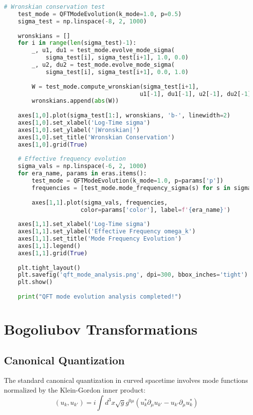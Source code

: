 \documentclass[11pt,a4paper]{article}
\begin{document}
\begin{lstlisting}[language=Python, caption=Cosmological Particle Creation]
    # Wronskian conservation test
    test_mode = QFTModeEvolution(k_mode=1.0, p=0.5)
    sigma_test = np.linspace(-8, 2, 1000)
    
    wronskians = []
    for i in range(len(sigma_test)-1):
        _, u1, du1 = test_mode.evolve_mode_sigma(
            sigma_test[i], sigma_test[i+1], 1.0, 0.0)
        _, u2, du2 = test_mode.evolve_mode_sigma(
            sigma_test[i], sigma_test[i+1], 0.0, 1.0)
        
        W = test_mode.compute_wronskian(sigma_test[i+1], 
                                       u1[-1], du1[-1], u2[-1], du2[-1])
        wronskians.append(abs(W))
    
    axes[1,0].plot(sigma_test[1:], wronskians, 'b-', linewidth=2)
    axes[1,0].set_xlabel('Log-Time sigma')
    axes[1,0].set_ylabel('|Wronskian|')
    axes[1,0].set_title('Wronskian Conservation')
    axes[1,0].grid(True)
    
    # Effective frequency evolution
    sigma_vals = np.linspace(-6, 2, 1000)
    for era_name, params in eras.items():
        test_mode = QFTModeEvolution(k_mode=1.0, p=params['p'])
        frequencies = [test_mode.mode_frequency_sigma(s) for s in sigma_vals]
        
        axes[1,1].plot(sigma_vals, frequencies, 
                      color=params['color'], label=f'{era_name}')
    
    axes[1,1].set_xlabel('Log-Time sigma')
    axes[1,1].set_ylabel('Effective Frequency omega_k')
    axes[1,1].set_title('Mode Frequency Evolution')
    axes[1,1].legend()
    axes[1,1].grid(True)
    
    plt.tight_layout()
    plt.savefig('qft_mode_analysis.png', dpi=300, bbox_inches='tight')
    plt.show()
    
    print("QFT mode evolution analysis completed!")
\end{lstlisting}

\section{Bogoliubov Transformations}

\subsection{Canonical Quantization}

The standard canonical quantization in curved spacetime involves mode functions normalized by the Klein-Gordon inner product:
\begin{equation}
(u_k, u_{k'}) = i \int d^3x \sqrt{g} g^{0\mu} (u_k^* \partial_\mu u_{k'} - u_{k'} \partial_\mu u_k^*)
\end{equation}
\end{document}
